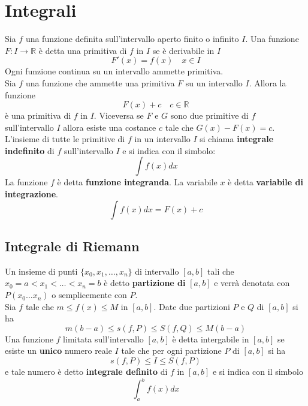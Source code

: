 \documentclass[12pt, a4paper]{report}
\begin{document}
    \chapter{Integrali}
    Sia $f$ una funzione definita sull'intervallo aperto finito o infinito $I$. Una funzione $F:I\to\mathbb{R}$ è detta una primitiva di $f$ in $I$ se è derivabile  in $I$
    \begin{equation*}
        F'(x)=f(x) \quad x\in I
    \end{equation*}
    Ogni funzione continua su un intervallo ammette primitiva.\\
    Sia $f$ una funzione che ammette una primitiva $F$ su un intervallo $I$. Allora la funzione
    \begin{equation*}
        F(x)+c \quad c\in \mathbb{R}
    \end{equation*}
    è una primitiva di $f$ in $I$. Viceversa se $F$ e $G$ sono due primitive di $f$ sull'intervallo $I$ allora esiste una costance $c$ tale che $G(x)-F(x)=c$.\\
    L'insieme di tutte le primitive di $f$ in un intervallo $I$ si chiama \textbf{integrale indefinito} di $f$ sull'intervallo $I$ e si indica con il simbolo:
    \begin{equation*}
        \int f(x)dx
    \end{equation*}
    La funzione $f$ è detta \textbf{funzione integranda}. La variabile $x$ è detta \textbf{variabile di integrazione}.
    \begin{equation*}
        \int f(x)dx=F(x)+c
    \end{equation*}
    \section{Integrale di Riemann}
    Un insieme di punti $\{x_{0},x_{1},\ldots,x_{n}\}$ di intervallo $[a,b]$ tali che $x_{0}=a<x_{1}<\ldots<x_{n}=b$ è detto \textbf{partizione di} $[a,b]$ e verrà denotata con $P(x_{0}\dots x_{n})$ o semplicemente con $P$.\\
    Sia $f$ tale che $m\leq f(x)\leq M$ in $[a,b]$. Date due partizioni $P$ e $Q$ di $[a,b]$ si ha
    \begin{equation*}
        m(b-a)\leq s(f,P)\leq S(f,Q)\leq M(b-a)
    \end{equation*}
    Una funzione $f$ limitata sull'intervallo $[a,b]$ è detta intergabile in $[a,b]$ se esiste un \textbf{unico} numero reale $I$ tale che per ogni partizione $P$ di $[a,b]$ si ha
    \begin{equation*}
        s(f,P)\leq I\leq S(f,P)
    \end{equation*}
    e tale numero è detto \textbf{integrale definito} di $f$ in $[a,b]$ e si indica con il simbolo
    \begin{equation*}
        \int_{a}^{b}f(x)dx
    \end{equation*}
\end{document}
